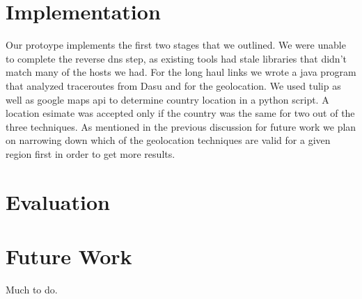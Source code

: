 \documentclass{acm_proc_article-sp}
\begin{document}
\section{Implementation}
Our protoype implements the first two stages that we outlined. We were unable to complete the reverse dns step, as existing tools 
had stale libraries that didn't match many of the hosts we had. For the long haul links we wrote a java program that analyzed traceroutes
from Dasu and for the geolocation. We used tulip as well as google maps api to determine country location in a python script.
A location esimate was accepted only if the country was the same for two out of the three techniques.
 As mentioned in the previous discussion for future work we plan on 
narrowing down which of the geolocation techniques are valid for a given region first in order to get more results.

\section{Evaluation}
\label{sec:approach}

\section{Future Work}
\label{sec:future}
Much to do.



\end{document}

